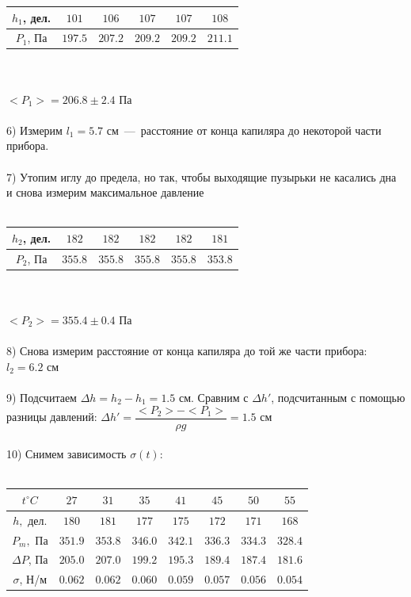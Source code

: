 \documentclass[12pt,a4paper,fleqn]{article}
\begin{document}
    \begin{tabular}{c | c | c | c | c | c}
        $h_1$, дел. & $101$ & $106$ & $107$ & $107$ & $108$ \\ \hline
        $P_1$, Па & $197.5$ & $207.2$ & $209.2$ & $209.2$ & $211.1$ \\
    \end{tabular} \\\\
    $<P_1> = 206.8 \pm 2.4$ Па\\\\
    6) Измерим $l_1 = 5.7$ см~---~расстояние от конца капиляра до некоторой части прибора.\\\\
    7) Утопим иглу до предела, но так, чтобы выходящие пузырьки не касались дна и снова измерим максимальное давление \\\\
    \begin{tabular}{c | c | c | c | c | c}
        $h_2$, дел. & $182$ & $182$ & $182$ & $182$ & $181$ \\ \hline
        $P_2$, Па & $355.8$ & $355.8$ & $355.8$ & $355.8$ & $353.8$ \\
    \end{tabular} \\\\
    $<P_2> = 355.4 \pm 0.4$ Па \\\\
    8) Снова измерим расстояние от конца капиляра до той же части прибора: $l_2 = 6.2$ см\\\\
    9) Подсчитаем $\Delta h = h_2 - h_1 = 1.5$ см. Сравним с $\Delta h'$, подсчитанным с помощью разницы давлений: $\Delta h' = \dfrac{<P_2> - <P_1>}{\rho g} = 1.5$ см \\\\
    10) Снимем зависимость $\sigma (t)$:\\\\
    \begin{tabular}{c | c | c | c | c | c | c | c}
        $t^{\circ}C$ & $27$ & $31$ & $35$ & $41$ & $45$ & $50$ & $55$\\ \hline
        $h,$ дел. & $180$ & $181$ & $177$ & $175$ & $172$ & $171$ & $168$\\ \hline
        $P_m,$ Па & $351.9$ & $353.8$ & $346.0$ & $342.1$ & $336.3$ & $334.3$ & $328.4$\\ \hline
        $\Delta P$, Па & $205.0$ & $207.0$ & $199.2$ & $195.3$ & $189.4$ & $187.4$ & $181.6$\\ \hline
        $\sigma$, Н/м & $0.062$ & $0.062$ & $0.060$ & $0.059$ & $0.057$ & $0.056$ & $0.054$\\ 
    \end{tabular} \\\\
\end{document}
